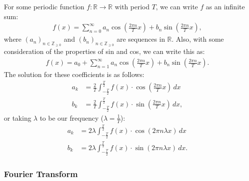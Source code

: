 For some periodic function $f : \mathbb{R} \to \mathbb{R}$ with period $T$,
we can write $f$ as an infinite sum: \begin{gather*}
    f(x) = \sum_{n = 0}^\infty 
        a_n \cos{\left( \frac{2\pi n}{T} x \right)} +
        b_n \sin{\left( \frac{2\pi n}{T} x \right)},
\end{gather*} where $(a_n)_{n \in \mathbb{Z}_{\geq 0}}$ and 
$(b_n)_{n \in \mathbb{Z}_{\geq 0}}$ are sequences in $\mathbb{R}$.
Also, with some consideration of the properties of sin and cos, we can write
this as: \begin{gather*}
    f(x) = a_0 + \sum_{n = 1}^\infty 
        a_n \cos{\left( \frac{2\pi n}{T} x \right)} +
        b_n \sin{\left( \frac{2\pi n}{T} x \right)}.
\end{gather*} The solution for these coefficients is as follows: \begin{align*}
    a_k &= \frac{2}{T} \int_{-\frac{T}{2}}^{\frac{T}{2}} 
        f(x) \cdot \cos{\left( \frac{2\pi n}{T} x \right)} \, dx \\
    b_k &= \frac{2}{T} \int_{-\frac{T}{2}}^{\frac{T}{2}} 
        f(x) \cdot \sin{\left( \frac{2\pi n}{T} x \right)} \, dx,
\end{align*} or taking $\lambda$ to be our frequency ($\lambda = \frac{1}{T}$): 
\begin{align*}
    a_k &= 2\lambda \int_{-\frac{T}{2}}^{\frac{T}{2}} 
        f(x) \cdot \cos{(2\pi n\lambda x)} \, dx \\
    b_k &= 2\lambda \int_{-\frac{T}{2}}^{\frac{T}{2}} 
        f(x) \cdot \sin{(2\pi n\lambda x)} \, dx.
\end{align*} 

\subsubsection{Fourier Transform}


